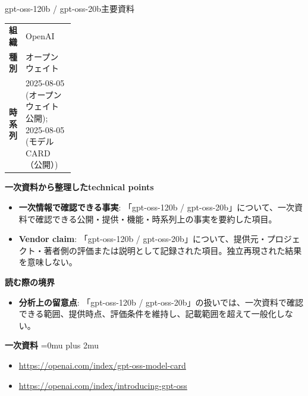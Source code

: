 \begin{technicalnote}{gpt-oss-120b / gpt-oss-20b}{主要資料}
\begingroup
\begin{tabularx}{\linewidth}{@{}>{\bfseries}p{0.22\linewidth}X@{}}
組織 & OpenAI \\
種別 & オープンウェイト \\
時系列 & 2025-08-05 (オープンウェイト公開); 2025-08-05 (モデル CARD（公開）) \\
\end{tabularx}
\smallskip
{\bfseries 一次資料から整理したtechnical points}
\begin{itemize}[leftmargin=1.5em,itemsep=0.35em]
\item \textbf{一次情報で確認できる事実}: 「gpt-oss-120b / gpt-oss-20b」について、一次資料で確認できる公開・提供・機能・時系列上の事実を要約した項目。
\item \textbf{Vendor claim}: 「gpt-oss-120b / gpt-oss-20b」について、提供元・プロジェクト・著者側の評価または説明として記録された項目。独立再現された結果を意味しない。
\end{itemize}
\begin{minipage}{\linewidth}
{\bfseries 読む際の境界}
\begin{itemize}[leftmargin=1.5em,itemsep=0.35em]
\item \textbf{分析上の留意点}: 「gpt-oss-120b / gpt-oss-20b」の扱いでは、一次資料で確認できる範囲、提供時点、評価条件を維持し、記載範囲を超えて一般化しない。
\end{itemize}
\begin{samepage}
{\bfseries 一次資料}
\begingroup\sloppy
\Urlmuskip=0mu plus 2mu\relax
\begin{itemize}[leftmargin=1.5em,itemsep=0.25em]
\item {\scriptsize\url{https://openai.com/index/gpt-oss-model-card}}
\item {\scriptsize\url{https://openai.com/index/introducing-gpt-oss}}
\end{itemize}
\endgroup
\end{samepage}
\end{minipage}
\endgroup
\end{technicalnote}
\medskip

